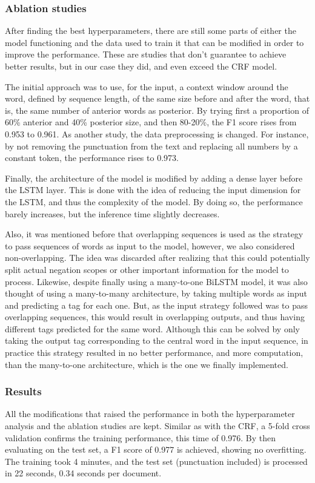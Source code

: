 \documentclass{article}
\begin{document}
\subsubsection*{Ablation studies}
After finding the best hyperparameters, there are still some parts of either the model functioning and the data used
to train it that can be modified in order to improve the performance. These are studies that don’t guarantee to
achieve better results, but in our case they did, and even exceed the CRF model.

The initial approach was to use, for the input, a context window around the word, defined by sequence length,
of the same size before and after the word, that is, the same number of anterior words as posterior. By trying first
a proportion of 60\% anterior and 40\% posterior size, and then 80-20\%, the F1 score rises from 0.953 to 0.961.
As another study, the data preprocessing is changed. For instance, by not removing the punctuation from the text and
replacing all numbers by a constant token, the performance rises to 0.973.

Finally, the architecture of the model is modified by adding a dense layer before the LSTM layer. This is done with
the idea of reducing the input dimension for the LSTM, and thus the complexity of the model. By doing so, the performance
barely increases, but the inference time slightly decreases.

Also, it was mentioned before that overlapping sequences is used as the strategy to pass sequences of words as input to
the model, however, we also considered non-overlapping. The idea was discarded after realizing that this could potentially
split actual negation scopes or other important information for the model to process. Likewise, despite finally using a
many-to-one BiLSTM model, it was also thought of using a many-to-many architecture, by taking multiple words as input and
predicting a tag for each one. But, as the input strategy followed was to pass overlapping sequences, this would result
in overlapping outputs, and thus having different tags predicted for the same word. Although this can be solved by only
taking the output tag corresponding to the central word in the input sequence, in practice this strategy resulted in no
better performance, and more computation, than the many-to-one architecture, which is the one we finally implemented.

\subsubsection*{Results}
All the modifications that raised the performance in both the hyperparameter analysis and the ablation studies are kept.
Similar as with the CRF, a 5-fold cross validation confirms the training performance, this time of 0.976. By then evaluating
on the test set, a F1 score of 0.977 is achieved, showing no overfitting. The training took 4 minutes, and the test set
(punctuation included) is processed in 22 seconds, 0.34 seconds per document.
\end{document}
